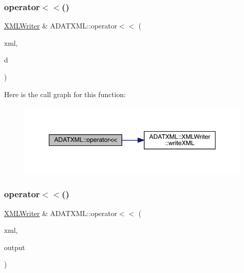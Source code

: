 \subsubsection{\texorpdfstring{operator$<$$<$()}{operator<<()}\hspace{0.1cm}{\footnotesize\ttfamily [14/26]}}
{\footnotesize\ttfamily \mbox{\hyperlink{classADATXML_1_1XMLWriter}{X\+M\+L\+Writer}} \& A\+D\+A\+T\+X\+M\+L\+::operator$<$$<$ (\begin{DoxyParamCaption}\item[{\mbox{\hyperlink{classADATXML_1_1XMLWriter}{X\+M\+L\+Writer}} \&}]{xml,  }\item[{const \mbox{\hyperlink{classADATXML_1_1XMLBufferWriter}{X\+M\+L\+Buffer\+Writer}} \&}]{d }\end{DoxyParamCaption})}

Here is the call graph for this function\+:\nopagebreak
\begin{figure}[H]
\begin{center}
\leavevmode
\includegraphics[width=347pt]{d2/da3/group__io_ga5f6c03929b05296b731cf36fb65cf9c6_cgraph}
\end{center}
\end{figure}
\mbox{\label{group__io_gaf8d83226be4c0dca61d0f9d2cad6f57b}} 
\subsubsection{\texorpdfstring{operator$<$$<$()}{operator<<()}\hspace{0.1cm}{\footnotesize\ttfamily [15/26]}}
{\footnotesize\ttfamily \mbox{\hyperlink{classADATXML_1_1XMLWriter}{X\+M\+L\+Writer}} \& A\+D\+A\+T\+X\+M\+L\+::operator$<$$<$ (\begin{DoxyParamCaption}\item[{\mbox{\hyperlink{classADATXML_1_1XMLWriter}{X\+M\+L\+Writer}} \&}]{xml,  }\item[{const std\+::string \&}]{output }\end{DoxyParamCaption})}

